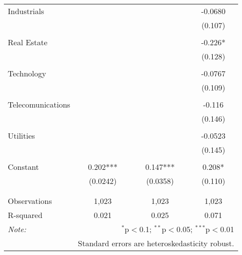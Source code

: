 \begin{table}[!htbp]
{\begin{tabular}{@{\extracolsep{5pt}}lccc}
Industrials &  &  & -0.0680 \\
 &  &  & (0.107) \\
  & & & \\ 
Real Estate &  &  & -0.226* \\
 &  &  & (0.128) \\
  & & & \\ 
Technology &  &  & -0.0767 \\
 &  &  & (0.109) \\
  & & & \\ 
Telecomunications &  &  & -0.116 \\
 &  &  & (0.146) \\
  & & & \\ 
Utilities &  &  & -0.0523 \\
 &  &  & (0.145) \\
  & & & \\ 
Constant & 0.202*** & 0.147*** & 0.208* \\
 & (0.0242) & (0.0358) & (0.110) \\
 &  &  &  \\
 \hline \\[-1.8ex] 
Observations & 1,023 & 1,023 & 1,023 \\
 R-squared & 0.021 & 0.025 & 0.071 \\ \hline

\textit{Note:}  & \multicolumn{3}{r}{$^{*}$p$<$0.1; $^{**}$p$<$0.05; $^{***}$p$<$0.01} \\ 
\textit{}  & \multicolumn{3}{r}{Standard errors are heteroskedasticity robust.} \\ 


\end{tabular} 
}
\end{table}
